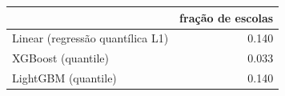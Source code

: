 \begin{tabular}{lr}
\toprule
 & fração de escolas \\
\midrule
Linear (regressão quantílica L1) & 0.140 \\
XGBoost (quantile) & 0.033 \\
LightGBM (quantile) & 0.140 \\
\bottomrule
\end{tabular}
